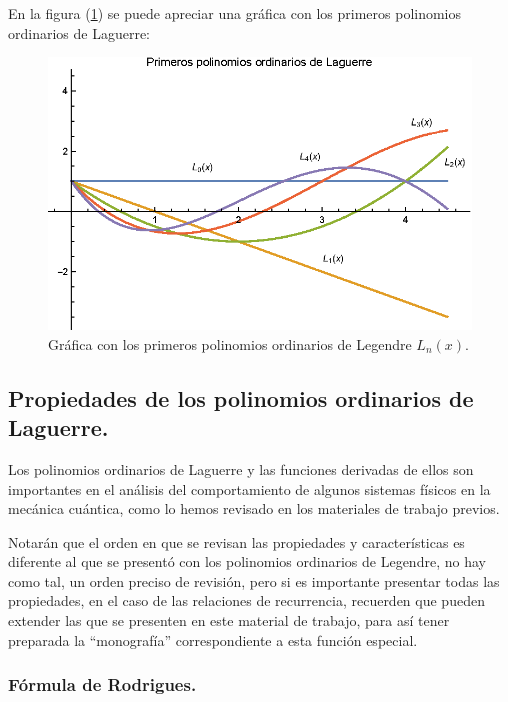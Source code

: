 En la figura (\ref{fig:grafica_Laguerre_01}) se puede apreciar una gráfica con los primeros polinomios ordinarios de Laguerre:
\begin{figure}[H]
    \centering
    \includegraphics[scale=1.2]{Imagenes/Polinomios_Laguerre_03.eps}
    \caption{Gráfica con los primeros polinomios ordinarios de Legendre $L_{n}(x)$.}
    \label{fig:grafica_Laguerre_01}
\end{figure}

\subsection{Propiedades de los polinomios ordinarios de Laguerre.}
Los polinomios ordinarios de Laguerre y las funciones derivadas de ellos son importantes en el análisis del comportamiento de algunos sistemas físicos en la mecánica cuántica, como lo hemos revisado en los materiales de trabajo previos.
\par
Notarán que el orden en que se revisan las propiedades y características es diferente al que se presentó con los polinomios ordinarios de Legendre, no hay como tal, un orden preciso de revisión, pero si es importante presentar todas las propiedades, en el caso de las relaciones de recurrencia, recuerden que pueden extender las que se presenten en este material de trabajo, para así tener preparada la \enquote{monografía} correspondiente a esta función especial.

\subsubsection{Fórmula de Rodrigues.}

